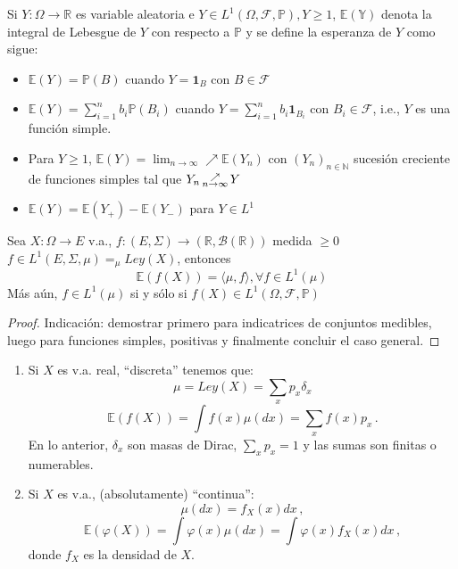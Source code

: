 \begin{definition}[Esperanza]
Si $Y:\Omega \longrightarrow \mathbb{R}$ es variable aleatoria e $Y\in L^1(\Omega,\mathcal{F},\mathbb{P}), Y\geq1$, $\mathbb{E(Y)}$ denota la integral de Lebesgue de $Y$ con respecto a $\mathbb{P}$ y se define la esperanza de $Y$ como sigue:

\begin{itemize}
    \item $\mathbb{E}(Y)=\mathbb{P}(B)$ cuando $Y=\mathbf{1}_B$ con $B \in \mathcal{F}$
    \item $\displaystyle\mathbb{E}(Y)=\sum^n_{i=1} b_i \mathbb{P}(B_i)$ cuando $\displaystyle Y=\sum^n_{i=1}b_i\mathbf{1}_{B_i}$ con $B_i \in \mathcal{F}$, i.e., $Y$ es una función simple.
    \item Para $Y\geq1$, $\mathbb{E}(Y) = \displaystyle \lim_{n\rightarrow \infty} \nearrow \mathbb{E}(Y_n)$ con $(Y_n)_{n \in \mathbb{N}}$ sucesión creciente de funciones simples tal que $Y_n \displaystyle \,\substack{\nearrow \\ \tiny{n\to\infty}}\, Y$  %
    \item $\mathbb{E}(Y) = \mathbb{E}(Y_+)-\mathbb{E}(Y_-)$ para $Y\in L^1$
\end{itemize}
\end{definition}

\begin{proposition}
Sea $X:\Omega \longrightarrow E $ v.a., $f:(E,\Sigma)\longrightarrow (\mathbb{R},\mathcal{B(\mathbb{R})})$ medida $\geq 0$ $f\in L^1(E,\Sigma,\mu) =_\mu Ley(X)$, entonces
$$ \mathbb{E}(f(X)) = \langle \mu,f \rangle, \forall f \in L^1(\mu)$$
Más aún, $f\in L^1(\mu)$ si y sólo si $f(X) \in L^1(\Omega,\mathcal{F},\mathbb{P})$
\end{proposition}
\begin{proof}
\ejercicio

Indicación: demostrar primero para indicatrices de conjuntos medibles, luego para funciones simples, positivas y finalmente concluir el caso general. 
\end{proof}

\begin{remark}
\beforeitemize
\begin{enumerate}
    \item Si $X$ es v.a. real, ``discreta'' tenemos que:
    $$ \mu=Ley(X) = \sum_x p_x\delta_x$$
    $$\mathbb{E}(f(X)) = \int f(x)\mu(dx) = \sum_x f(x)p_x \, .$$
    En lo anterior, $\delta_x$ son masas de Dirac, $\sum_xp_x = 1$ y las sumas son finitas o numerables.
    \item Si $X$ es v.a., (absolutamente) ``continua'':
    $$ \mu(dx) = f_X(x)dx \, ,$$ 
    $$ \mathbb{E}(\varphi(X))=\int \varphi(x)\mu(dx)=\int\varphi(x) f_X(x)dx \, ,$$
    donde $f_X$ es la densidad de $X$.
\end{enumerate}
\end{remark}

